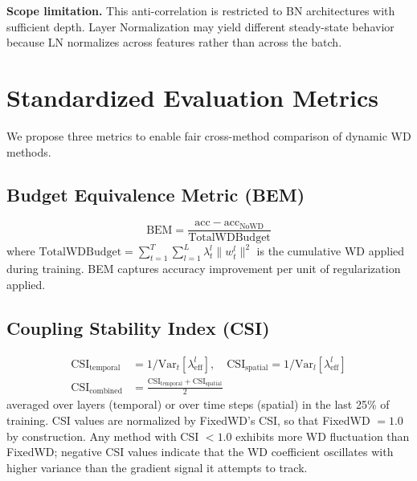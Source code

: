 \documentclass{article}
\begin{document}
\textbf{Scope limitation.} This anti-correlation is restricted to BN architectures with sufficient depth. Layer Normalization may yield different steady-state behavior because LN normalizes across features rather than across the batch.

\section{Standardized Evaluation Metrics}
\label{sec:metrics}

We propose three metrics to enable fair cross-method comparison of dynamic WD methods.

\subsection{Budget Equivalence Metric (BEM)}

\begin{equation}
\text{BEM} = \frac{\text{acc} - \text{acc}_{\text{NoWD}}}{\text{TotalWDBudget}}
\label{eq:bem}
\end{equation}
where $\text{TotalWDBudget} = \sum_{t=1}^{T} \sum_{l=1}^{L} \lambda_t^l \|w_t^l\|^2$ is the cumulative WD applied during training. BEM captures accuracy improvement per unit of regularization applied.

\subsection{Coupling Stability Index (CSI)}
\label{sec:csi_def}

\begin{align}
\text{CSI}_{\text{temporal}} &= 1 / \text{Var}_t[\lambda_{\text{eff}}^l], \quad \text{CSI}_{\text{spatial}} = 1 / \text{Var}_l[\lambda_{\text{eff}}^l] \label{eq:csi_components}\\
\text{CSI}_{\text{combined}} &= \frac{\text{CSI}_{\text{temporal}} + \text{CSI}_{\text{spatial}}}{2} \label{eq:csi_combined}
\end{align}
averaged over layers (temporal) or over time steps (spatial) in the last 25\% of training. CSI values are normalized by FixedWD's CSI, so that FixedWD $= 1.0$ by construction. Any method with CSI $< 1.0$ exhibits more WD fluctuation than FixedWD; negative CSI values indicate that the WD coefficient oscillates with higher variance than the gradient signal it attempts to track.
\end{document}
